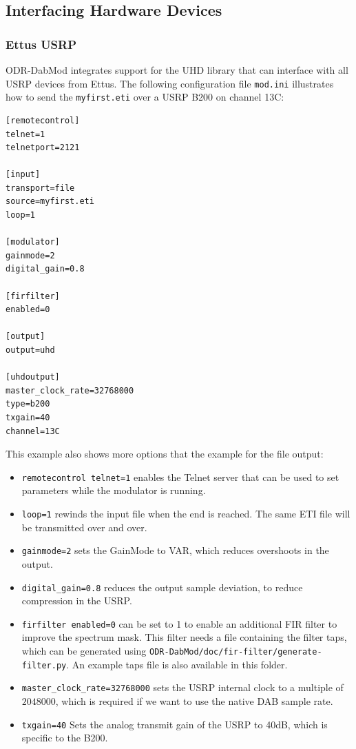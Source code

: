 \subsection{Interfacing Hardware Devices}
\subsubsection{Ettus USRP}
ODR-DabMod integrates support for the UHD library that can interface with all
USRP devices from Ettus. The following configuration file \texttt{mod.ini}
illustrates how to send the \texttt{myfirst.eti} over a USRP B200 on channel
13C:

\begin{lstlisting}
[remotecontrol]
telnet=1
telnetport=2121

[input]
transport=file
source=myfirst.eti
loop=1

[modulator]
gainmode=2
digital_gain=0.8

[firfilter]
enabled=0

[output]
output=uhd

[uhdoutput]
master_clock_rate=32768000
type=b200
txgain=40
channel=13C
\end{lstlisting}

This example also shows more options that the example for the file output:

\begin{itemize}
    \item \texttt{remotecontrol telnet=1} enables the Telnet server that can be
        used to set parameters while the modulator is running.
    \item \texttt{loop=1} rewinds the input file when the end is reached. The
        same ETI file will be transmitted over and over.
    \item \texttt{gainmode=2} sets the GainMode to VAR, which reduces
        overshoots in the output.
    \item \texttt{digital\_gain=0.8} reduces the output sample deviation, to
        reduce compression in the USRP.
    \item \texttt{firfilter enabled=0} can be set to 1 to enable an additional
        FIR filter to improve the spectrum mask. This filter needs a file
        containing the filter taps, which can be generated using
        \texttt{ODR-DabMod/doc/fir-filter/generate-filter.py}. An example taps
        file is also available in this folder.
    \item \texttt{master\_clock\_rate=32768000} sets the USRP internal clock to
        a multiple of $2048000$, which is required if we want to use the native
        DAB sample rate.
    \item \texttt{txgain=40} Sets the analog transmit gain of the USRP to 40dB,
        which is specific to the B200.
\end{itemize}

